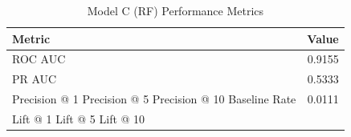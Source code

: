 \begin{table}[h]
\centering
\begin{tabular}{lr}
\toprule
Metric & Value \\
\midrule
ROC AUC & 0.9155 \\
PR AUC & 0.5333 \\
Precision @ 1%
Precision @ 5%
Precision @ 10%
Baseline Rate & 0.0111 \\
Lift @ 1%
Lift @ 5%
Lift @ 10%
\bottomrule
\end{tabular}
\caption{Model C (RF) Performance Metrics}
\label{tab:modelc_rf_metrics}
\end{table}
